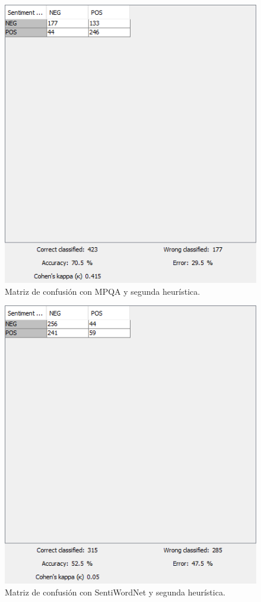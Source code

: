 \begin{figure}[H]
    \center\includegraphics[width=.95\linewidth]{img/analysis/score1-2.png}
    \caption{Matriz de confusión con MPQA y segunda heurística.}
\end{figure}

\begin{figure}[H]
    \center\includegraphics[width=.95\linewidth]{img/analysis/score2-2.png}
    \caption{Matriz de confusión con SentiWordNet y segunda heurística.}
\end{figure}

